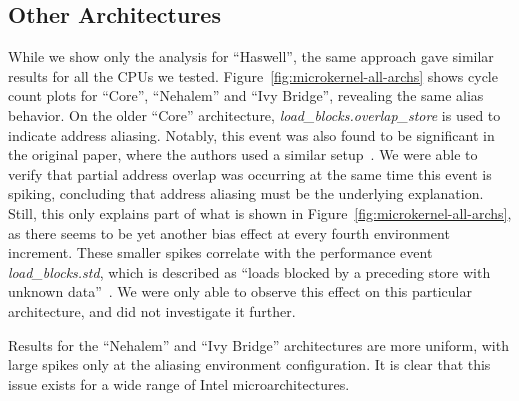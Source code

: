 \documentclass[10pt, conference, compsocconf]{IEEEtran}
\begin{document}
\subsection{Other Architectures}
While we show only the analysis for ``Haswell'', the same approach gave similar results for all the CPUs we tested.
Figure~\ref{fig:microkernel-all-archs} shows cycle count plots for ``Core'', ``Nehalem'' and ``Ivy Bridge'', revealing the same alias behavior.
On the older ``Core'' architecture, \emph{load\_blocks.overlap\_store} is used to indicate address aliasing.
Notably, this event was also found to be significant in the original paper, where the authors used a similar setup~\cite{Mytkowicz:2009:WrongData}.
We were able to verify that partial address overlap was occurring at the same time this event is spiking, concluding that address aliasing must be the underlying explanation.
Still, this only explains part of what is shown in Figure~\ref{fig:microkernel-all-archs}, as there seems to be yet another bias effect at every fourth environment increment.
These smaller spikes correlate with the performance event \emph{load\_blocks.std}, which is described as ``loads blocked by a preceding store with unknown data''~\cite[Table 19-17]{Volume3B}.
We were only able to observe this effect on this particular architecture, and did not investigate it further.%

Results for the ``Nehalem'' and ``Ivy Bridge'' architectures are more uniform, with large spikes only at the aliasing environment configuration.
It is clear that this issue exists for a wide range of Intel microarchitectures.

\end{document}
